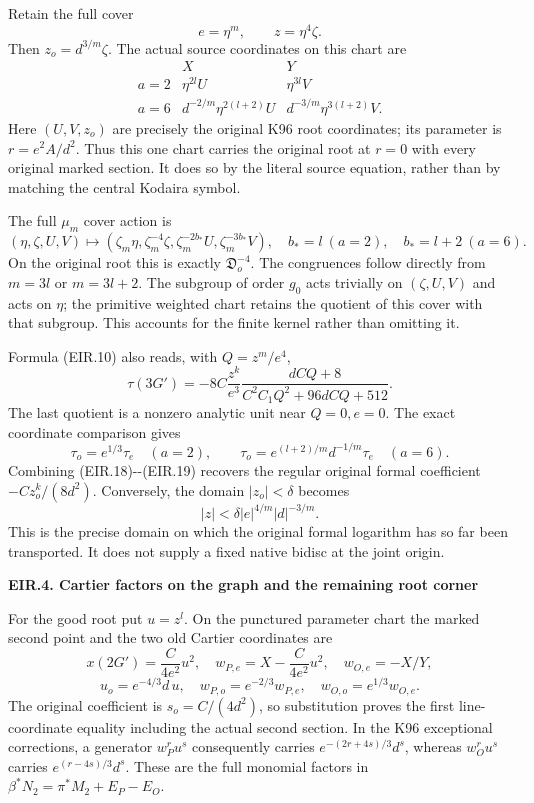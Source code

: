 Retain the full cover
\[
 e=\eta^m,\qquad z=\eta^4\zeta.
 \tag{EIR.15}
\]
Then \(z_o=d^{3/m}\zeta\). The actual source coordinates on this
chart are
\[
 \begin{array}{c|cc}
 &X&Y\\\hline
 a=2&\eta^{2l}U&\eta^{3l}V\\
 a=6&d^{-2/m}\eta^{2(l+2)}U&
        d^{-3/m}\eta^{3(l+2)}V .
 \end{array}
 \tag{EIR.16}
\]
Here \((U,V,z_o)\) are precisely the original K96 root coordinates;
its parameter is \(r=e^2A/d^2\). Thus this one chart carries the
original root at \(r=0\) with every original marked section. It
does so by the literal source equation, rather than by matching
the central Kodaira symbol.

The full \(\mu_m\) cover action is
\[
 (\eta,\zeta,U,V)\longmapsto
 (\zeta_m\eta,\zeta_m^{-4}\zeta,
   \zeta_m^{-2b_*}U,\zeta_m^{-3b_*}V),
 \quad b_*=l\ (a=2),\quad b_*=l+2\ (a=6).
 \tag{EIR.17}
\]
On the original root this is exactly \(\mathfrak D_o^{-4}\).
The congruences follow directly from \(m=3l\) or \(m=3l+2\).
The subgroup of order \(g_0\) acts trivially on
\((\zeta,U,V)\) and acts on \(\eta\); the primitive weighted
chart retains the quotient of this cover with that subgroup.
This accounts for the finite kernel rather than omitting it.

Formula (EIR.10) also reads, with \(Q=z^m/e^4\),
\[
 \tau(3G')=-8C\frac{z^k}{e^3}
       \frac{dCQ+8}{C^2C_1Q^2+96dCQ+512}.
 \tag{EIR.18}
\]
The last quotient is a nonzero analytic unit near \(Q=0,e=0\).
The exact coordinate comparison gives
\[
 \tau_o=e^{1/3}\tau_e\quad(a=2),\qquad
 \tau_o=e^{(l+2)/m}d^{-1/m}\tau_e\quad(a=6).
 \tag{EIR.19}
\]
Combining (EIR.18)-\/-(EIR.19) recovers the regular original
formal coefficient \(-Cz_o^k/(8d^2)\). Conversely, the domain
\(|z_o|<\delta\) becomes
\[
 |z|<\delta |e|^{4/m}|d|^{-3/m}.
 \tag{EIR.20}
\]
This is the precise domain on which the original formal logarithm
has so far been transported. It does not supply a fixed native
bidisc at the joint origin.

\par

\medskip\noindent\textbf{EIR.4. Cartier factors on the graph and the remaining root corner}

\par\nobreak

For the good root put \(u=z^l\). On the punctured parameter chart
the marked second point and the two old Cartier coordinates are
\[
 x(2G')=\frac C{4e^2}u^2,\quad
 w_{P,e}=X-\frac C{4e^2}u^2,\quad w_{O,e}=-X/Y,
\]
\[
 u_o=e^{-4/3}d\,u,\quad
 w_{P,o}=e^{-2/3}w_{P,e},\quad
 w_{O,o}=e^{1/3}w_{O,e}.
 \tag{EIR.21}
\]
The original coefficient is \(s_o=C/(4d^2)\), so substitution
proves the first line-coordinate equality including the actual
second section. In the K96 exceptional corrections, a generator
\(w_P^r u^s\) consequently carries
\(e^{-(2r+4s)/3}d^s\), whereas \(w_O^r u^s\) carries
\(e^{(r-4s)/3}d^s\). These are the full monomial factors in
\(\beta^*N_2=\pi^*M_2+E_P-E_O\).

